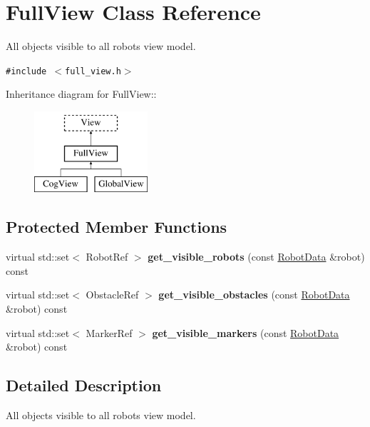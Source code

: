 \hypertarget{class_full_view}{
\section{FullView Class Reference}
\label{class_full_view}
}
All objects visible to all robots view model.  


{\tt \#include $<$full\_\-view.h$>$}

Inheritance diagram for FullView::\begin{figure}[H]
\begin{center}
\leavevmode
\includegraphics[height=3cm]{class_full_view}
\end{center}
\end{figure}
\subsection*{Protected Member Functions}
\begin{CompactItemize}
\item 
\hypertarget{class_full_view_2cf3b852e0fe260e10720d0d15c7f955}{
virtual std::set$<$ RobotRef $>$ \textbf{get\_\-visible\_\-robots} (const \hyperlink{class_robot_data}{RobotData} \&robot) const }
\label{class_full_view_2cf3b852e0fe260e10720d0d15c7f955}

\item 
\hypertarget{class_full_view_c70e733b24bcff73a2396738c2b0b7d5}{
virtual std::set$<$ ObstacleRef $>$ \textbf{get\_\-visible\_\-obstacles} (const \hyperlink{class_robot_data}{RobotData} \&robot) const }
\label{class_full_view_c70e733b24bcff73a2396738c2b0b7d5}

\item 
\hypertarget{class_full_view_cd69a9cdcc846e1b3f6394f0221b395c}{
virtual std::set$<$ MarkerRef $>$ \textbf{get\_\-visible\_\-markers} (const \hyperlink{class_robot_data}{RobotData} \&robot) const }
\label{class_full_view_cd69a9cdcc846e1b3f6394f0221b395c}

\end{CompactItemize}


\subsection{Detailed Description}
All objects visible to all robots view model. 


